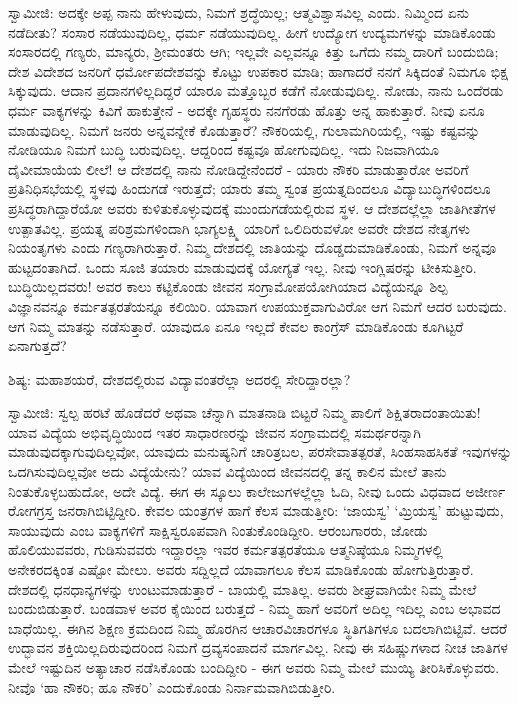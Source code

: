 ಸ್ವಾಮೀಜಿ: ಅದಕ್ಕೇ ಅಪ್ಪ ನಾನು ಹೇಳುವುದು, ನಿಮಗೆ ಶ್ರದ್ಧೆಯಿಲ್ಲ; ಆತ್ಮವಿಶ್ವಾಸವಿಲ್ಲ ಎಂದು. ನಿಮ್ಮಿಂದ ಏನು ನಡೆದೀತು? ಸಂಸಾರ ನಡೆಯುವುದಿಲ್ಲ, ಧರ್ಮ ನಡೆಯುವುದಿಲ್ಲ. ಹೀಗೆ ಉದ್ಯೋಗ ಉದ್ಯಮಗಳನ್ನು ಮಾಡಿಕೊಂಡು ಸಂಸಾರದಲ್ಲಿ ಗಣ್ಯರು, ಮಾನ್ಯರು, ಶ‍್ರೀಮಂತರು ಆಗಿ; ಇಲ್ಲವೇ ಎಲ್ಲವನ್ನೂ ಕಿತ್ತು ಒಗೆದು ನಮ್ಮ ದಾರಿಗೆ ಬಂದುಬಿಡಿ; ದೇಶ ವಿದೇಶದ ಜನರಿಗೆ ಧರ್ಮೋಪದೇಶವನ್ನು ಕೊಟ್ಟು ಉಪಕಾರ ಮಾಡಿ; ಹಾಗಾದರೆ ನನಗೆ ಸಿಕ್ಕಿದಂತೆ ನಿಮಗೂ ಭಿಕ್ಷ ಸಿಕ್ಕುವುದು. ಆದಾನ ಪ್ರದಾನಗಳಿಲ್ಲದಿದ್ದರೆ ಯಾರೂ ಮತ್ತೊಬ್ಬರ ಕಡೆಗೆ ನೋಡುವುದಿಲ್ಲ. ನೋಡು, ನಾನು ಒಂದೆರಡು ಧರ್ಮ ವಾಕ್ಯಗಳನ್ನು ಕಿವಿಗೆ ಹಾಕುತ್ತೇನೆ - ಅದಕ್ಕೇ ಗೃಹಸ್ಥರು ನನಗೆರಡು ಹೊತ್ತು ಅನ್ನ ಹಾಕುತ್ತಾರೆ. ನೀವು ಏನೂ ಮಾಡುವುದಿಲ್ಲ. ನಿಮಗೆ ಜನರು ಅನ್ನವನ್ನೇಕೆ ಕೊಡುತ್ತಾರೆ? ನೌಕರಿಯಲ್ಲಿ, ಗುಲಾಮಗಿರಿಯಲ್ಲಿ, ಇಷ್ಟು ಕಷ್ಟವನ್ನು ನೋಡಿಯೂ ನಿಮಗೆ ಬುದ್ಧಿ ಬರುವುದಿಲ್ಲ. ಆದ್ದರಿಂದ ಕಷ್ಟವೂ ಹೋಗುವುದಿಲ್ಲ. ಇದು ನಿಜವಾಗಿಯೂ ದೈವೀಮಾಯೆಯ ಲೀಲೆ! ಆ ದೇಶದಲ್ಲಿ ನಾನು ನೋಡಿದ್ದೇನೆಂದರೆ - ಯಾರು ನೌಕರಿ ಮಾಡುತ್ತಾರೋ ಅವರಿಗೆ ಪ್ರತಿನಿಧಿಸಭೆಯಲ್ಲಿ ಸ್ಥಳವು ಹಿಂದುಗಡೆ ಇರುತ್ತದೆ; ಯಾರು ತಮ್ಮ ಸ್ವಂತ ಪ್ರಯತ್ನದಿಂದಲೂ ವಿದ್ಯಾಬುದ್ಧಿಗಳಿಂದಲೂ ಪ್ರಸಿದ್ಧರಾಗಿದ್ದಾರೆಯೋ ಅವರು ಕುಳಿತುಕೊಳ್ಳುವುದಕ್ಕೆ ಮುಂದುಗಡೆಯಲ್ಲಿರುವ ಸ್ಥಳ. ಆ ದೇಶದಲ್ಲೆಲ್ಲಾ ಜಾತಿಗೀತೆಗಳ ಉತ್ಪಾತವಿಲ್ಲ. ಪ್ರಯತ್ನ ಪರಿಶ್ರಮಗಳಿಂದಾಗಿ ಭಾಗ್ಯಲಕ್ಷ್ಮಿ ಯಾರಿಗೆ ಒಲಿದಿರುವಳೋ ಅವರೇ ದೇಶದ ನೇತೃಗಳು ನಿಯಂತೃಗಳು ಎಂದು ಗಣ್ಯರಾಗಿರುತ್ತಾರೆ. ನಿಮ್ಮ ದೇಶದಲ್ಲಿ ಜಾತಿಯನ್ನು ದೊಡ್ಡದುಮಾಡಿಕೊಂಡು, ನಿಮಗೆ ಅನ್ನವೂ ಹುಟ್ಟದಂತಾಗಿದೆ. ಒಂದು ಸೂಜಿ ತಯಾರು ಮಾಡುವುದಕ್ಕೆ ಯೋಗ್ಯತೆ ಇಲ್ಲ. ನೀವು ಇಂಗ್ಲಿಷರನ್ನು ಟೀಕಿಸುತ್ತೀರಿ. ಬುದ್ಧಿಯಿಲ್ಲದವರು! ಅವರ ಕಾಲು ಕಟ್ಟಿಕೊಂಡು ಜೀವನ ಸಂಗ್ರಾಮೋಪಯೋಗಿಯಾದ ವಿದ್ಯೆಯನ್ನೂ ಶಿಲ್ಪ ವಿಜ್ಞಾನವನ್ನೂ ಕರ್ಮತತ್ಪರತೆಯನ್ನೂ ಕಲಿಯಿರಿ. ಯಾವಾಗ ಉಪಯುಕ್ತವಾಗುವಿರೋ ಆಗ ನಿಮಗೆ ಆದರ ಬರುವುದು. ಆಗ ನಿಮ್ಮ ಮಾತನ್ನು ನಡೆಸುತ್ತಾರೆ. ಯಾವುದೂ ಏನೂ ಇಲ್ಲದೆ ಕೇವಲ ಕಾಂಗ್ರೆಸ್ ಮಾಡಿಕೊಂಡು ಕೂಗಿಟ್ಟರೆ ಏನಾಗುತ್ತದೆ?

ಶಿಷ್ಯ: ಮಹಾಶಯರೆ, ದೇಶದಲ್ಲಿರುವ ವಿದ್ಯಾವಂತರೆಲ್ಲಾ ಅದರಲ್ಲಿ ಸೇರಿದ್ದಾರಲ್ಲಾ?

ಸ್ವಾಮೀಜಿ: ಸ್ವಲ್ಪ ಹರಟೆ ಹೊಡೆದರೆ ಅಥವಾ ಚೆನ್ನಾಗಿ ಮಾತನಾಡಿ ಬಿಟ್ಟರೆ ನಿಮ್ಮ ಪಾಲಿಗೆ ಶಿಕ್ಷಿತರಾದಂತಾಯಿತು! ಯಾವ ವಿದ್ಯೆಯ ಅಭಿವೃದ್ಧಿಯಿಂದ ಇತರ ಸಾಧಾರಣರನ್ನು ಜೀವನ ಸಂಗ್ರಾಮದಲ್ಲಿ ಸಮರ್ಥರನ್ನಾಗಿ ಮಾಡುವುದಕ್ಕಾಗುವುದಿಲ್ಲವೋ, ಯಾವುದು ಮನುಷ್ಯನಿಗೆ ಚಾರಿತ್ರಬಲ, ಪರಸೇವಾತತ್ಪರತೆ, ಸಿಂಹಸಾಹಸಿಕತೆ ಇವುಗಳನ್ನು ಒದಗಿಸುವುದಿಲ್ಲವೋ ಅದು ವಿದ್ಯೆಯೇನು? ಯಾವ ವಿದ್ಯೆಯಿಂದ ಜೀವನದಲ್ಲಿ ತನ್ನ ಕಾಲಿನ ಮೇಲೆ ತಾನು ನಿಂತುಕೊಳ್ಳಬಹುದೋ, ಅದೇ ವಿದ್ಯೆ. ಈಗ ಈ ಸ್ಕೂಲು ಕಾಲೇಜುಗಳಲ್ಲೆಲ್ಲಾ ಓದಿ, ನೀವು ಒಂದು ವಿಧವಾದ ಅಜೀರ್ಣ ರೋಗಗ್ರಸ್ತ ಜನರಾಗಿಬಿಟ್ಟಿದ್ದೀರಿ. ಕೇವಲ ಯಂತ್ರಗಳ ಹಾಗೆ ಕೆಲಸ ಮಾಡುತ್ತೀರಿ: ‘ಜಾಯಸ್ವ’ ‘ಮ್ರಿಯಸ್ವ’ ಹುಟ್ಟುವುದು, ಸಾಯುವುದು ಎಂಬ ವಾಕ್ಯಗಳಿಗೆ ಸಾಕ್ಷಿಸ್ವರೂಪವಾಗಿ ನಿಂತುಕೊಂಡಿದ್ದೀರಿ. ಆರಂಬಗಾರರು, ಜೋಡು ಹೊಲಿಯುವವರು, ಗುಡಿಸುವವರು ಇದ್ದಾರಲ್ಲಾ ಇವರ ಕರ್ಮತತ್ಪರತೆಯೂ ಆತ್ಮನಿಷ್ಠೆಯೂ ನಿಮ್ಮಗಳಲ್ಲಿ ಅನೇಕರದಕ್ಕಿಂತ ಎಷ್ಟೋ ಮೇಲು. ಅವರು ಸದ್ದಿಲ್ಲದೆ ಯಾವಾಗಲೂ ಕೆಲಸ ಮಾಡಿಕೊಂಡು ಹೋಗುತ್ತಿರುತ್ತಾರೆ. ದೇಶದಲ್ಲಿ ಧನಧಾನ್ಯಗಳನ್ನು ಉಂಟುಮಾಡುತ್ತಾರೆ - ಬಾಯಲ್ಲಿ ಮಾತಿಲ್ಲ. ಅವರು ಶೀಘ್ರವಾಗಿಯೇ ನಿಮ್ಮ ಮೇಲೆ ಬಂದುಬಿಡುತ್ತಾರೆ. ಬಂಡವಾಳ ಅವರ ಕೈಯಿಂದ ಬರುತ್ತದೆ - ನಿಮ್ಮ ಹಾಗೆ ಅವರಿಗೆ ಅದಿಲ್ಲ ಇದಿಲ್ಲ ಎಂಬ ಅಭಾವದ ಬಾಧೆಯಿಲ್ಲ. ಈಗಿನ ಶಿಕ್ಷಣ ಕ್ರಮದಿಂದ ನಿಮ್ಮ ಹೊರಗಿನ ಆಚಾರವಿಚಾರಗಳೂ ಸ್ಥಿತಿಗತಿಗಳೂ ಬದಲಾಗಿಬಿಟ್ಟಿವೆ. ಆದರೆ ಉದ್ಭಾವನ ಶಕ್ತಿಯಿಲ್ಲದಿರುವುದರಿಂದ ನಿಮಗೆ ದ್ರವ್ಯಸಂಪಾದನೆ ಮಾರ್ಗವಿಲ್ಲ. ನೀವು ಈ ಸಹಿಷ್ಣುಗಳಾದ ನೀಚ ಜಾತಿಗಳ ಮೇಲೆ ಇಷ್ಟುದಿನ ಅತ್ಯಾಚಾರ ನಡೆಸಿಕೊಂಡು ಬಂದಿದ್ದೀರಿ - ಈಗ ಅವರು ನಿಮ್ಮ ಮೇಲೆ ಮುಯ್ಯಿ ತೀರಿಸಿಕೊಳ್ಳುವರು. ನೀವೊ ‘ಹಾ ನೌಕರಿ; ಹೂ ನೌಕರಿ’ ಎಂದುಕೊಂಡು ನಿರ್ನಾಮವಾಗಿಬಿಡುತ್ತೀರಿ.

